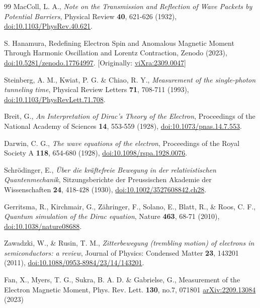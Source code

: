 \documentclass[%
 reprint,
 amsmath,amssymb,
 aps,
]{revtex4-1}
\numberwithin{equation}{section}%
\begin{document}
\begin{thebibliography}{99}
MacColl, L. A.,
\textit{Note on the Transmission and Reflection of Wave Packets by Potential Barriers},
Physical Review \textbf{40}, 621-626 (1932),
\href{https://doi.org/10.1103/PhysRev.40.621}{doi:10.1103/PhysRev.40.621}.

S. Hanamura, Redefining Electron Spin and Anomalous Magnetic Moment Through Harmonic Oscillation and Lorentz Contraction, Zenodo (2023), \href{https://doi.org/10.5281/zenodo.17764997}{doi:10.5281/zenodo.17764997}. [Originally: \href{https://vixra.org/abs/2309.0047}{viXra:2309.0047}]

Steinberg, A. M., Kwiat, P. G. \& Chiao, R. Y.,
\textit{Measurement of the single-photon tunneling time},
Physical Review Letters \textbf{71}, 708-711 (1993),
\href{https://doi.org/10.1103/PhysRevLett.71.708}{doi:10.1103/PhysRevLett.71.708}.

Breit, G.,
\textit{An Interpretation of Dirac's Theory of the Electron},
Proceedings of the National Academy of Sciences \textbf{14}, 553-559 (1928),
\href{https://doi.org/10.1073/pnas.14.7.553}{doi:10.1073/pnas.14.7.553}.

Darwin, C. G.,
\textit{The wave equations of the electron},
Proceedings of the Royal Society A \textbf{118}, 654-680 (1928),
\href{https://doi.org/10.1098/rspa.1928.0076}{doi:10.1098/rspa.1928.0076}.

Schrödinger, E.,
\textit{Über die kräftefreie Bewegung in der relativistischen Quantenmechanik},
Sitzungsberichte der Preussischen Akademie der Wissenschaften \textbf{24}, 418-428 (1930),
\href{https://doi.org/10.1002/3527608842.ch28}{doi:10.1002/3527608842.ch28}.

Gerritsma, R., Kirchmair, G., Zähringer, F., Solano, E., Blatt, R., \& Roos, C. F.,
\textit{Quantum simulation of the Dirac equation},
Nature \textbf{463}, 68-71 (2010),
\href{https://doi.org/10.1038/nature08688}{doi:10.1038/nature08688}.

Zawadzki, W., \& Rusin, T. M.,
\textit{Zitterbewegung (trembling motion) of electrons in semiconductors: a review},
Journal of Physics: Condensed Matter \textbf{23}, 143201 (2011),
\href{https://doi.org/10.1088/0953-8984/23/14/143201}{doi:10.1088/0953-8984/23/14/143201}.


Fan, X., Myers, T. G., Sukra, B. A. D. \& Gabrielse, G., Measurement of the Electron Magnetic Moment, Phys. Rev. Lett. \textbf{130}, no.7, 071801 \href{https://arxiv.org/abs/2209.13084}{arXiv:2209.13084} (2023)

\end{thebibliography}


\end{document}
